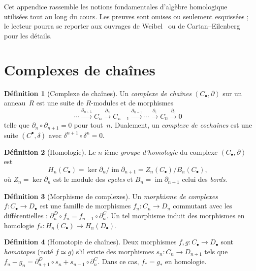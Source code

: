 \documentclass[12pt,a4paper,openany]{book}
\theoremstyle{definition}
\newtheorem{definition}{Définition}[chapter]
\theoremstyle{plain}
\theoremstyle{remark}
\DeclareMathOperator{\im}{im}
\begin{document}
Cet appendice rassemble les notions fondamentales d'algèbre homologique utilisées
tout au long du cours. Les preuves sont omises ou seulement esquissées ; le lecteur
pourra se reporter aux ouvrages de Weibel~\cite{weibel} ou de
Cartan--Eilenberg~\cite{cartan-eilenberg} pour les détails.

\section{Complexes de chaînes}\label{sec:complexes-chaines}

\begin{definition}[Complexe de chaînes]\label{def:complexe-chaines}
  Un \emph{complexe de chaînes} $(C_\bullet, \partial)$ sur un anneau~$R$ est une
  suite de $R$-modules et de morphismes
  \[
    \cdots \xrightarrow{\partial_{n+1}} C_n \xrightarrow{\partial_n}
    C_{n-1} \xrightarrow{\partial_{n-1}} \cdots
    \xrightarrow{\partial_1} C_0 \xrightarrow{\partial_0} 0
  \]
  telle que $\partial_n \circ \partial_{n+1} = 0$ pour tout~$n$. Dualement, un
  \emph{complexe de cochaînes} est une suite
  $(C^\bullet, \delta)$ avec $\delta^{n+1} \circ \delta^n = 0$.
\end{definition}

\begin{definition}[Homologie]\label{def:homologie-complexe}
  Le $n$-ième \emph{groupe d'homologie} du complexe
  $(C_\bullet, \partial)$ est
  \[
    H_n(C_\bullet) = \ker \partial_n / \im \partial_{n+1}
    = Z_n(C_\bullet) / B_n(C_\bullet),
  \]
  où $Z_n = \ker \partial_n$ est le module des \emph{cycles} et
  $B_n = \im \partial_{n+1}$ celui des \emph{bords}.
\end{definition}

\begin{definition}[Morphisme de complexes]\label{def:morphisme-complexes}
  Un \emph{morphisme de complexes} $f \colon C_\bullet \to D_\bullet$ est une
  famille de morphismes $f_n \colon C_n \to D_n$ commutant avec les différentielles :
  $\partial^D_n \circ f_n = f_{n-1} \circ \partial^C_n$. Un tel morphisme induit
  des morphismes en homologie $f_* \colon H_n(C_\bullet) \to H_n(D_\bullet)$.
\end{definition}

\begin{definition}[Homotopie de chaînes]\label{def:homotopie-chaines}
  Deux morphismes $f, g \colon C_\bullet \to D_\bullet$ sont \emph{homotopes}
  (noté $f \simeq g$) s'il existe des morphismes $s_n \colon C_n \to D_{n+1}$ tels
  que $f_n - g_n = \partial^D_{n+1} \circ s_n + s_{n-1} \circ \partial^C_n$.
  Dans ce cas, $f_* = g_*$ en homologie.
\end{definition}
\end{document}
